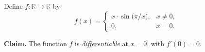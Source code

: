 \begin{problem}
Define $f : \mathbb{R} \to \mathbb{R}$ by
\[
  f(x) =
  \begin{cases}
    x \cdot \sin\!\bigl(\pi / x\bigr), & x \neq 0, \\
    0, & x = 0.
  \end{cases}
\]

\textbf{Claim.} The function $f$ is \emph{differentiable} at
$x = 0$, with $f'(0) = 0$.
\end{problem}
